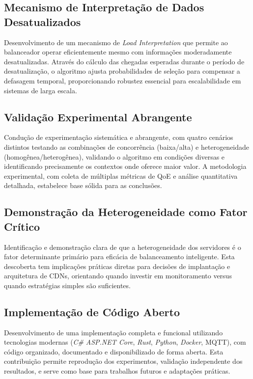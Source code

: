 \subsection{Mecanismo de Interpretação de Dados Desatualizados} 

Desenvolvimento de um mecanismo de \textit{Load Interpretation} que permite ao balanceador operar eficientemente mesmo com informações moderadamente desatualizadas. Através do cálculo das chegadas esperadas durante o período de desatualização, o algoritmo ajusta probabilidades de seleção para compensar a defasagem temporal, proporcionando robustez essencial para escalabilidade em sistemas de larga escala.

\subsection{Validação Experimental Abrangente}

Condução de experimentação sistemática e abrangente, com quatro cenários distintos testando as combinações de concorrência (baixa/alta) e heterogeneidade (homogênea/heterogênea), validando o algoritmo em condições diversas e identificando precisamente os contextos onde oferece maior valor. A metodologia experimental, com coleta de múltiplas métricas de QoE e análise quantitativa detalhada, estabelece base sólida para as conclusões.

\subsection{Demonstração da Heterogeneidade como Fator Crítico}

Identificação e demonstração clara de que a heterogeneidade dos servidores é o fator determinante primário para eficácia de balanceamento inteligente. Esta descoberta tem implicações práticas diretas para decisões de implantação e arquitetura de CDNs, orientando quando investir em monitoramento versus quando estratégias simples são suficientes.

\subsection{Implementação de Código Aberto}

Desenvolvimento de uma implementação completa e funcional utilizando tecnologias modernas (\textit{C\#} \textit{ASP.NET Core}, \textit{Rust}, \textit{Python}, \textit{Docker}, MQTT), com código organizado, documentado e disponibilizado de forma aberta. Esta contribuição permite reprodução dos experimentos, validação independente dos resultados, e serve como base para trabalhos futuros e adaptações práticas.

